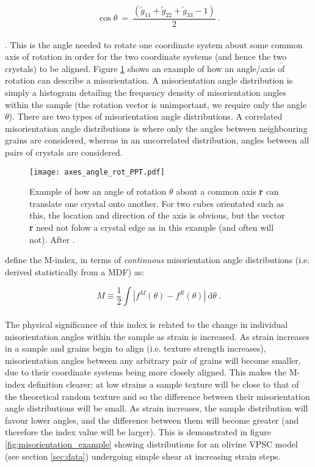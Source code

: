 \documentclass[a4paper,12pt,twoside]{report}
\numberwithin{equation}{chapter}
\begin{document}
\begin{equation} \label{eq:misorientation_angle}
\cos{\theta}\ =\ \frac{(\tilde{g}_{11} + \tilde{g}_{22} + \tilde{g}_{33} - 1)}{2}\ .
\end{equation} 
\\
\citep{Randle2000}. This is the angle needed to rotate one coordinate system about some common axis of rotation in order for the two coordinate systems (and hence the two crystals) to be aligned. Figure \ref{fig:angle-axis_example} shows an example of how an angle/axis of rotation can describe a misorientation. A misorientation angle distribution is simply a histogram detailing the frequency density of misorientation angles within the sample (the rotation vector is unimportant, we require only the angle $\theta$). There are two types of misorientation angle distributions. A correlated misorientation angle distributions is where only the angles between neighbouring grains are considered, whereas in an uncorrelated distribution, angles between all pairs of crystals are considered.

\begin{figure}[h]
  \centering
    \texttt{[image: axes\_angle\_rot\_PPT.pdf]}
  \caption[Angle/axis of rotation example]{Example of how an angle of rotation $\theta$ about a common axis \textbf{r} can translate one crystal onto another. For two cubes orientated such as this, the location and direction of the axis is obvious, but the vector \textbf{r} need not folow a crystal edge as in this example (and often will not). After \cite{Randle2000}.}
  \label{fig:angle-axis_example}
\end{figure}

\cite{Skemer} define the M-index, in terms of \emph{continuous} misorientation angle distributions (i.e. derived statistically from a MDF) as:

\begin{equation} \label{eq:Mindex_cont}
M \equiv \frac{1}{2} \int | f^M(\theta) - f^R(\theta) |\ \mathrm{d}\theta \ .
\end{equation}  
\\   
The physical significance of this index is related to the change in individual misorientation angles within the sample as strain is increased. As strain increases in a sample and grains begin to align (i.e. texture strength increases), misorientation angles between any arbitrary pair of grains will become smaller, due to their coordinate systems being more closely aligned. This makes the M-index definition clearer: at low strains a sample texture will be close to that of the theoretical random texture and so the difference between their misorientation angle distributions will be small. As strain increases, the sample distribution will favour lower angles, and the difference between them will become greater (and therefore the index value will be larger). This is demonstrated in figure \ref{fig:misorientation_example} showing distributions for an olivine VPSC model (see section \ref{sec:data}) undergoing simple shear at increasing strain steps.
\end{document}
